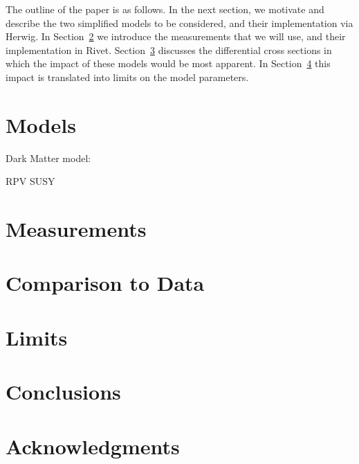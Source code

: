 \documentclass[floatfix]{article}
\begin{document}
The outline of the paper is as follows. In the next section, we motivate and describe the two 
simplified models to be considered, and their implementation via Herwig. In Section~\ref{sec:measurements}
we introduce the measurements that we will use, and their implementation in Rivet. Section~\ref{sec:kinematics}
discusses the differential cross sections in which the impact of these models would be 
most apparent. In Section~\ref{sec:limits} this impact is translated into limits on the model parameters.

\section{Models}\label{sec:models}


Dark Matter model:
\cite{Kahlhoefer:2015bea}

RPV SUSY


\section{Measurements}\label{sec:measurements}

\section{Comparison to Data}\label{sec:kinematics}

\section{Limits}\label{sec:limits}

\section{Conclusions}\label{sec:conclusions}

\section*{Acknowledgments}





\end{document}
